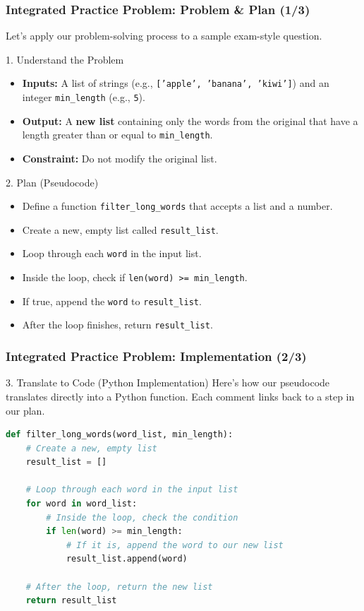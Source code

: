 \documentclass{beamer}
\begin{document}
\begin{frame}[fragile]
    \frametitle{Integrated Practice Problem: Problem \& Plan (1/3)}
    Let's apply our problem-solving process to a sample exam-style question.

    \begin{block}{1. Understand the Problem}
        \begin{itemize}
            \item \textbf{Inputs:} A list of strings (e.g., \texttt{['apple', 'banana', 'kiwi']}) and an integer \texttt{min\_length} (e.g., \texttt{5}).
            \item \textbf{Output:} A \textbf{new list} containing only the words from the original that have a length greater than or equal to \texttt{min\_length}.
            \item \textbf{Constraint:} Do not modify the original list.
        \end{itemize}
    \end{block}

    \begin{block}{2. Plan (Pseudocode)}
        \begin{itemize}
            \item Define a function \texttt{filter\_long\_words} that accepts a list and a number.
            \item Create a new, empty list called \texttt{result\_list}.
            \item Loop through each \texttt{word} in the input list.
            \item Inside the loop, check if \texttt{len(word) >= min\_length}.
            \item If true, append the \texttt{word} to \texttt{result\_list}.
            \item After the loop finishes, return \texttt{result\_list}.
        \end{itemize}
    \end{block}
\end{frame}

\begin{frame}[fragile]
    \frametitle{Integrated Practice Problem: Implementation (2/3)}

    \begin{block}{3. Translate to Code (Python Implementation)}
        Here's how our pseudocode translates directly into a Python function. Each comment links back to a step in our plan.
        \begin{lstlisting}[language=Python, basicstyle=\small\ttfamily, commentstyle=\color{gray}]
def filter_long_words(word_list, min_length):
    # Create a new, empty list
    result_list = []
    
    # Loop through each word in the input list
    for word in word_list:
        # Inside the loop, check the condition
        if len(word) >= min_length:
            # If it is, append the word to our new list
            result_list.append(word)
            
    # After the loop, return the new list
    return result_list
        \end{lstlisting}
    \end{block}
\end{frame}
\end{document}
